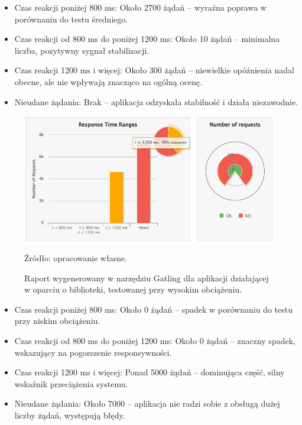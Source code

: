 \documentclass[runningheads,12pt]{llncs}
\begin{document}
\begin{itemize}
    \item Czas reakcji poniżej 800 ms: Około 2700 żądań – wyraźna poprawa w porównaniu do testu średniego.
    \item Czas reakcji od 800 ms do poniżej 1200 ms: Około 10 żądań – minimalna liczba, pozytywny sygnał stabilizacji.
    \item Czas reakcji 1200 ms i więcej: Około 300 żądań – niewielkie opóźnienia nadal obecne, ale nie wpływają znacząco na ogólną ocenę.
    \item Nieudane żądania: Brak – aplikacja odzyskała stabilność i działa niezawodnie.
\end{itemize}

\newpage

\begin{figure}
    \centering
    \includegraphics[width=0.8\linewidth]{images/library-gatling-high-graph.jpg}
    \caption{Raport wygenerowany w narzędziu Gatling dla aplikacji działającej w oparciu o biblioteki, testowanej przy wysokim obciążeniu.}
    \vspace{0.5em}
    {\small Źródło: opracowanie własne.}
    \label{fig:high}
\end{figure}

\begin{itemize}
    \item Czas reakcji poniżej 800 ms: Około 0 żądań – spadek w porównaniu do testu przy niskim obciążeniu.
    \item Czas reakcji od 800 ms do poniżej 1200 ms: Około 0 żądań – znaczny spadek, wskazujący na pogorszenie responsywności.
    \item Czas reakcji 1200 ms i więcej: Ponad 5000 żądań – dominująca część, silny wskaźnik przeciążenia systemu.
    \item Nieudane żądania: Około 7000 – aplikacja nie radzi sobie z obsługą dużej liczby żądań, występują błędy.
\end{itemize}
\end{document}
